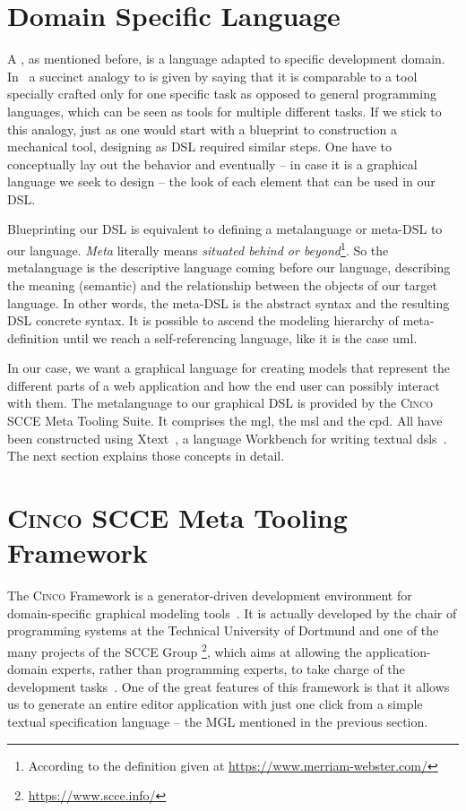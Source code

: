 \section{Domain Specific Language}\label{sec:DSL}

A , as mentioned before, is a language adapted to specific development domain. In~\cite{Naujokat2018} a succinct analogy to  is given by saying that it is comparable to a tool specially crafted only for one specific task as opposed to general programming languages, which can be seen as tools for multiple different tasks. If we stick to this analogy, just as one would start with a blueprint to construction a mechanical tool, designing as DSL required similar steps. One have to conceptually lay out the behavior and eventually -- in case it is a graphical language we seek to design -- the look of each element that can be used in our DSL.

Blueprinting our DSL is equivalent to defining a metalanguage or meta-DSL to our language. \textit{Meta} literally means \textit{situated behind or beyond}\footnote{According to the definition given at \url{https://www.merriam-webster.com/}}. So the metalanguage is the descriptive language coming before our language, describing the meaning (semantic) and the relationship between the objects of our target language. In other words, the meta-DSL is the abstract syntax and the resulting DSL concrete syntax. It is possible to ascend the modeling hierarchy of meta-definition until we reach a self-referencing language, like it is the case \gls{uml}.

In our case, we want a graphical language for creating models that represent the different parts of a web application and how the end user can possibly interact with them. The metalanguage to our graphical DSL is provided by the \textsc{Cinco} SCCE Meta Tooling Suite. It comprises the \gls{mgl}, the \gls{msl} and the \gls{cpd}. All have been constructed using Xtext~\cite{bettini2016implementing}, a language Workbench for writing textual \glspl*{dsl}~\cite{naujokat-diss}. The next section explains those concepts in detail.

\section{\textsc{Cinco SCCE} Meta Tooling Framework}\label{sec:cincoFW}


The \textsc{Cinco} Framework is a generator-driven development environment for domain-specific graphical modeling tools~\cite{Cinco}. It is actually developed by the chair of programming systems at the Technical University of Dortmund and one of the many projects of the SCCE Group \footnote[1]{\url{https://www.scce.info/}}, which aims at allowing the application-domain experts, rather than programming experts, to take charge of the development tasks~\cite{scce}. One of the great features of this framework is that it allows us to generate an entire editor application with just one click from a simple textual specification language -- the MGL mentioned in the previous section. 

